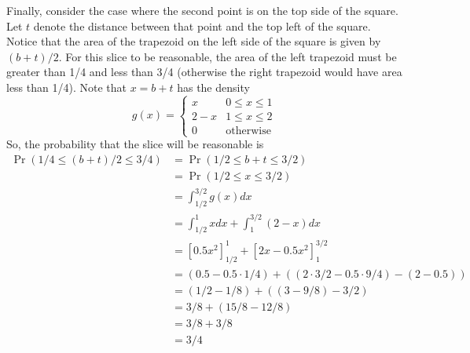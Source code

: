 \documentclass[12pt]{article}
\begin{document}
Finally, consider the case where the second point is on the top side of the square. Let $t$ denote the distance between that point and the top left of the square. Notice that the area of the trapezoid on the left side of the square is given by $(b + t) / 2$. For this slice to be reasonable, the area of the left trapezoid must be greater than 1/4 and less than 3/4 (otherwise the right trapezoid would have area less than 1/4). Note that $x = b + t$ has the density
\begin{equation}
	g(x) =
	\left\{\begin{array}{cl}
	x & 0 \leq x\leq 1 \\
	2 - x & 1 \leq x \leq 2\\
	0 & \mbox{otherwise}
	\end{array}\right.
\end{equation}
So, the probability that the slice will be reasonable is
\begin{align}
	\nonumber
	\Pr(1/4 \leq (b+t)/2 \leq 3/4) &= \Pr(1/2 \leq b+t \leq 3/2)\\
	&= \Pr(1/2 \leq x \leq 3/2) \\
	&= \int_{1/2}^{3/2} g(x) dx\\
	&= \int_{1/2}^1 x dx + \int_1^{3/2} (2-x) dx\\
	&= \left[0.5x^2\right]_{1/2}^1 + \left[2x - 0.5x^2\right]_1^{3/2}\\
	&= (0.5 - 0.5\cdot1/4) + ((2\cdot 3/2 - 0.5\cdot 9/4) - (2 - 0.5))\\
	&= (1/2 - 1/8) + ((3 - 9/8) - 3/2)\\
	&= 3/8 + (15/8 - 12/8)\\
	&= 3/8 + 3/8\\
	&= 3/4
\end{align}
\end{document}

